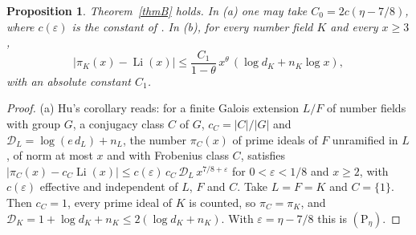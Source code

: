 \documentclass[11pt]{amsart}
\newtheorem{proposition}[thm]{Proposition}
\theoremstyle{definition}
\theoremstyle{remark}
\newcommand{\Ph}[1]{(\mathrm P_{#1})}
\newcommand{\Li}{\operatorname{Li}}
\begin{document}
\begin{proposition}\label{prop:PIT}
Theorem~\ref{thmB} holds. In {\rm(a)} one may take $C_0=2c(\eta-7/8)$, where $c(\varepsilon)$ is the constant of \cite[Corollary~9.6]{Hu}. In {\rm(b)}, for every number field $K$ and every $x\ge3$,
\begin{equation}\label{eq:PITtheta}
 \bigl|\pi_K(x)-\Li(x)\bigr|\le\frac{C_1}{1-\theta}\,x^{\theta}\,(\log d_K+n_K\log x),
\end{equation}
with an absolute constant $C_1$.
\end{proposition}

\begin{proof}
(a) Hu's corollary reads: for a finite Galois extension $L/F$ of number fields with group $G$, a conjugacy class $C$ of $G$, $c_C=|C|/|G|$ and $\mathcal D_L=\log(e\,d_L)+n_L$, the number $\pi_C(x)$ of prime ideals of $F$ unramified in $L$, of norm at most $x$ and with Frobenius class $C$, satisfies $|\pi_C(x)-c_C\Li(x)|\le c(\varepsilon)\,c_C\,\mathcal D_L\,x^{7/8+\varepsilon}$ for $0<\varepsilon<1/8$ and $x\ge2$, with $c(\varepsilon)$ effective and independent of $L$, $F$ and $C$. Take $L=F=K$ and $C=\{1\}$. Then $c_C=1$, every prime ideal of $K$ is counted, so $\pi_C=\pi_K$, and $\mathcal D_K=1+\log d_K+n_K\le2(\log d_K+n_K)$. With $\varepsilon=\eta-7/8$ this is $\Ph\eta$.


\end{proof}
\end{document}
